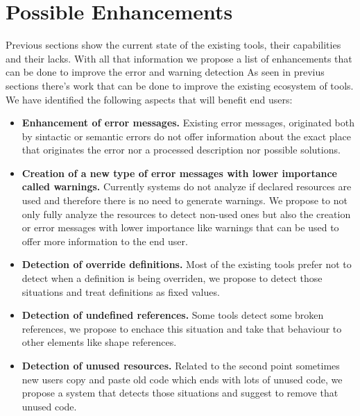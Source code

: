 \section{Possible Enhancements}
Previous sections show the current state of the existing tools, their capabilities and their lacks.
With all that information we propose a list of enhancements that can be done to improve the error and warning detection
As seen in previus sections there's work that can be done to improve the existing ecosystem of tools. We have identified the following aspects
that will benefit end users:

\begin{itemize}
    \item \textbf{Enhancement of error messages.} Existing error messages, originated both by sintactic or semantic errors do not offer information about
    the exact place that originates the error nor a processed description nor possible solutions.
    \item \textbf{Creation of a new type of error messages with lower importance called warnings.} Currently systems do not analyze if declared resources are
    used and therefore there is no need to generate warnings. We propose to not only fully analyze the resources to detect non-used ones but also the creation
    or error messages with lower importance like warnings that can be used to offer more information to the end user.
    \item \textbf{Detection of override definitions.} Most of the existing tools prefer not to detect when a definition is being overriden, we propose to detect those
    situations and treat definitions as fixed values.
    \item \textbf{Detection of undefined references.} Some tools detect some broken references, we propose to enchace this situation and take that behaviour to
    other elements like shape references.
    \item \textbf{Detection of unused resources.} Related to the second point sometimes new users copy and paste old code which ends with lots of unused code,
    we propose a system that detects those situations and suggest to remove that unused code.
\end{itemize}